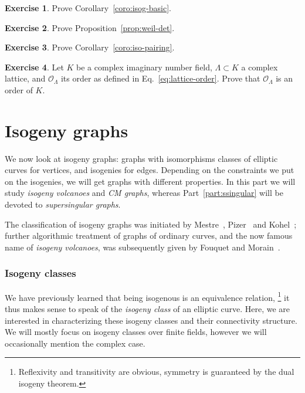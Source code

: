 \documentclass[10pt]{article}
\theoremstyle{plain}
\theoremstyle{definition}
\newtheorem{exercise}{Exercise}[part]
\def\O{\ensuremath{\mathcal{O}}}
\begin{document}
\begin{exercise}
  Prove Corollary~\ref{coro:isog-basic}.
\end{exercise}

\begin{exercise}
  Prove Proposition~\ref{prop:weil-det}.
\end{exercise}

\begin{exercise}
  Prove Corollary~\ref{coro:iso-pairing}.
\end{exercise}

\begin{exercise}
  Let $K$ be a complex imaginary number field, $Λ⊂K$ a complex
  lattice, and $\O_Λ$ its order as defined in
  Eq.~\eqref{eq:lattice-order}. %
  Prove that $\O_Λ$ is an order of $K$.
\end{exercise}



\clearpage
\part{Isogeny graphs}

We now look at isogeny graphs: graphs with isomorphisms classes of
elliptic curves for vertices, and isogenies for edges. %
Depending on the constraints we put on the isogenies, we will get
graphs with different properties. %
In this part we will study \emph{isogeny volcanoes} and \emph{CM graphs},
whereas Part~\ref{part:ssingular} will be devoted to
\emph{supersingular graphs}.

The classification of isogeny graphs was initiated by
Mestre~\cite{mestre86}, Pizer~\cite{pizer1,pizer2} and
Kohel~\cite{kohel}; further algorithmic treatment of graphs of
ordinary curves, and the now famous name of \emph{isogeny volcanoes},
was subsequently given by Fouquet and
Morain~\cite{fouquet+morain02}. %


\section{Isogeny classes}

We have previously learned that being isogenous is an equivalence
relation,%
\footnote{Reflexivity and transitivity are obvious, symmetry is
  guaranteed by the dual isogeny theorem.} %
it thus makes sense to speak of the \emph{isogeny class} of an elliptic
curve. %
Here, we are interested in characterizing these isogeny classes and
their connectivity structure. %
We will mostly focus on isogeny classes over finite fields, however we
will occasionally mention the complex case.
\end{document}
